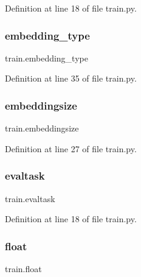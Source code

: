 Definition at line 18 of file train.\+py.

\mbox{\label{namespacetrain_a2744f49b5a52ff04d0e4092511249a78}} 
\subsubsection{\texorpdfstring{embedding\+\_\+type}{embedding\_type}}
{\footnotesize\ttfamily train.\+embedding\+\_\+type}



Definition at line 35 of file train.\+py.

\mbox{\label{namespacetrain_a9f48b0b5e52b38ed4a74e4a7b5a4387a}} 
\subsubsection{\texorpdfstring{embeddingsize}{embeddingsize}}
{\footnotesize\ttfamily train.\+embeddingsize}



Definition at line 27 of file train.\+py.

\mbox{\label{namespacetrain_acb7f4a3a66aa0f5aac1fb5bde04c56a7}} 
\subsubsection{\texorpdfstring{evaltask}{evaltask}}
{\footnotesize\ttfamily train.\+evaltask}



Definition at line 18 of file train.\+py.

\mbox{\label{namespacetrain_af6ce307b1ddd4745a96b7834bc0232dc}} 
\subsubsection{\texorpdfstring{float}{float}}
{\footnotesize\ttfamily train.\+float}



